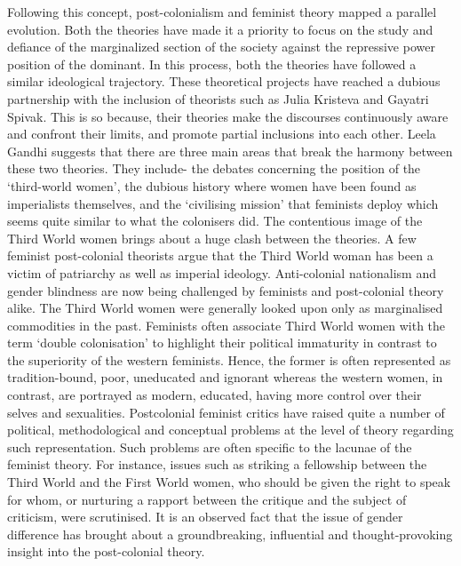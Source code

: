 Following this concept, post-colonialism and feminist theory mapped a parallel evolution. Both the theories have made it a priority to focus on the study and defiance of the marginalized section of the society against the repressive power position of the dominant. In this process, both the theories have followed a similar ideological trajectory. These theoretical projects have reached a dubious partnership with the inclusion of theorists such as Julia Kristeva and Gayatri Spivak. This is so because, their theories make the discourses continuously aware and confront their limits, and promote partial inclusions into each other. Leela Gandhi suggests that there are three main areas that break the harmony between these two theories. They include- the debates concerning the position of the ‘third-world women’, the dubious history where women have been found as imperialists themselves, and the ‘civilising mission’ that feminists deploy which seems quite similar to what the colonisers did. The contentious image of the Third World women brings about a huge clash between the theories. A few feminist post-colonial theorists argue that the Third World woman has been a victim of patriarchy as well as imperial ideology. Anti-colonial nationalism and gender blindness are now being challenged by feminists and post-colonial theory alike. The Third World women were generally looked upon only as marginalised commodities in the past. Feminists often associate Third World women with the term ‘double colonisation’ to highlight their political immaturity in contrast to the superiority of the western feminists. Hence, the former is often represented as tradition-bound, poor, uneducated and ignorant whereas the western women, in contrast, are portrayed as modern, educated, having more control over their selves and sexualities. Postcolonial feminist critics have raised quite a number of political, methodological and conceptual problems at the level of theory regarding such representation. Such problems are often specific to the lacunae of the feminist theory. For instance, issues such as striking a fellowship between the Third World and the First World women, who should be given the right to speak for whom, or nurturing a rapport between the critique and the subject of criticism, were scrutinised. It is an observed fact that the issue of gender difference has brought about a groundbreaking, influential and thought-provoking insight into the post-colonial theory. 


